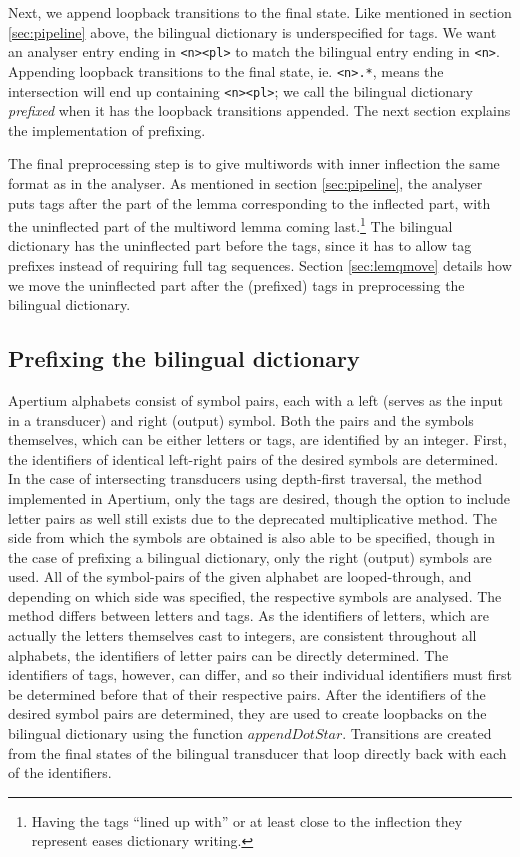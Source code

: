 \documentclass[10pt, a4paper]{article}
\newcommand{\ana}[1]{\texttt{#1}}
\begin{document}
Next, we append loopback transitions to the final state. Like
mentioned in section \ref{sec:pipeline} above, the bilingual
dictionary is underspecified for tags. We want an analyser entry
ending in \ana{<n><pl>} to match the bilingual entry ending in
\ana{<n>}. Appending loopback transitions to the final state, ie.
\ana{<n>.*}, means the intersection will end up containing
\ana{<n><pl>}; we call the bilingual dictionary \emph{prefixed} when
it has the loopback transitions appended. The next section explains
the implementation of prefixing.

The final preprocessing step is to give multiwords with inner
inflection the same format as in the analyser. As mentioned in section
\ref{sec:pipeline}, the analyser puts tags after the part of the lemma
corresponding to the inflected part, with the uninflected part of the
multiword lemma coming last.\footnote{Having the tags ``lined up
with'' or at least close to the inflection they represent eases
dictionary writing.} The bilingual dictionary has the uninflected part
before the tags, since it has to allow tag prefixes instead of
requiring full tag sequences.  Section \ref{sec:lemqmove} details how
we move the uninflected part after the (prefixed) tags in
preprocessing the bilingual dictionary.

\subsection{Prefixing the bilingual dictionary}

Apertium alphabets consist of symbol pairs, each with a left (serves
as the input in a transducer) and right (output) symbol. Both the
pairs and the symbols themselves, which can be either letters or tags,
are identified by an integer. First, the identifiers of identical
left-right pairs of the desired symbols are determined. In the case of
intersecting transducers using depth-first traversal, the method
implemented in Apertium, only the tags are desired, though the option
to include letter pairs as well still exists due to the deprecated
multiplicative method. The side from which the symbols are obtained is
also able to be specified, though in the case of prefixing a bilingual
dictionary, only the right (output) symbols are used. All of the
symbol-pairs of the given alphabet are looped-through, and depending
on which side was specified, the respective symbols are analysed. The
method differs between letters and tags. As the identifiers of
letters, which are actually the letters themselves cast to integers,
are consistent throughout all alphabets, the identifiers of letter
pairs can be directly determined. The identifiers of tags, however,
can differ, and so their individual identifiers must first be
determined before that of their respective pairs. After the
identifiers of the desired symbol pairs are determined, they are used
to create loopbacks on the bilingual dictionary using the function
$appendDotStar$. Transitions are created from the final states
of the bilingual transducer that loop directly back with each of the
identifiers.
\end{document}

